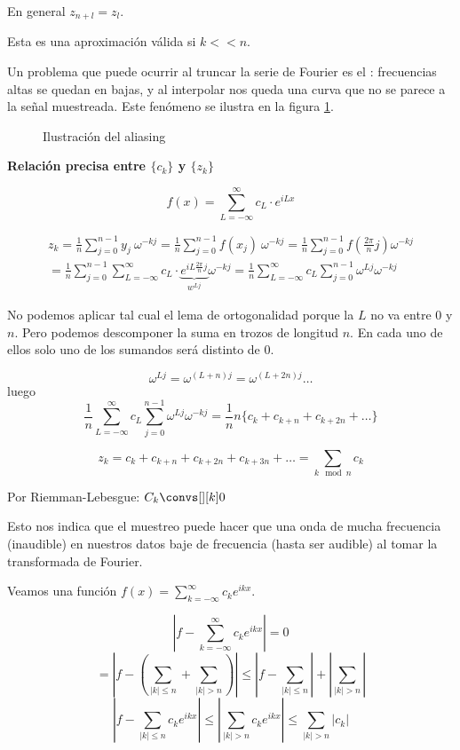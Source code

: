 			En general $z_{n+l} = z_{l}$.

			Esta es una aproximación válida si  $k << n$.

			Un problema que puede ocurrir al truncar la serie de Fourier es el : frecuencias altas se quedan en bajas, y al interpolar nos queda una curva que no se parece a la señal muestreada. Este fenómeno se ilustra en la figura \ref{fig:Aliasing}.
			\begin{figure}[hbtp]
				\caption{Ilustración del aliasing}
				\label{fig:Aliasing}
			\end{figure}


			\textbf{Relación precisa entre $\{c_k\}$ y $\{z_k\}$}

			\[ f(x) = \sum_{L=-\infty}^\infty c_L \cdot e^{iLx}  \]

			\begin{gather*}
			z_k = \frac{1}{n}  \sum_{j=0}^{n-1} y_j\ \omega^{-kj} = \frac{1}{n} \sum_{j=0}^{n-1}  f(x_j)\ \omega^{-kj} = \frac{1}{n} \sum_{j=0}^{n-1} f\left( \frac{2\pi}{n} j \right) \omega^{-kj}  \\
			= \frac{1}{n} \sum_{j=0}^{n-1} \sum_{L=-\infty}^{\infty} c_L \cdot \underbrace{e^{iL\frac{2\pi}{n}j}}_{w^{Lj}} \omega^{-kj} = \frac{1}{n} \sum_{L=-\infty}^{\infty} c_L \sum_{j=0}^{n-1} \omega^{Lj} \omega^{-kj}
			\end{gather*}

			No podemos aplicar tal cual el lema de ortogonalidad porque la $L$ no va entre 0 y $n$. Pero podemos descomponer la suma en trozos de longitud $n$. En cada uno de ellos solo uno de los sumandos será distinto de 0.

			\[ \omega^{Lj} = \omega^{(L+n)j} = \omega^{(L+2n)j} … \]
			luego
			\[ \frac{1}{n} \sum_{L=-\infty}^{\infty} c_L \sum_{j=0}^{n-1} \omega^{Lj} \omega^{-kj} = \frac{1}{n} n \{ c_k + c_{k+n} + c_{k+2n} + … \}  \]

			\[ z_k = c_k + c_{k+n} + c_{k+2n} + c_{k+3n} + … = \sum_{k \mod n} c_k  \]

			Por Riemman-Lebesgue: $C_k \convs[][k] 0$

			Esto nos indica que el muestreo puede hacer que una onda de mucha frecuencia (inaudible) en nuestros datos baje de frecuencia (hasta ser audible) al tomar la transformada de Fourier.


			\obs Veamos una función $f(x) = \sum\limits_{k=-\infty}^{\infty} c_k e^{ikx}$.

			\[ \left|  f - \sum_{k=-\infty}^{\infty} c_k e^{ikx} \right| = 0 \]
			\[ = \left|  f - \left( \sum_{|k|\leq n} + \sum_{|k| > n} \right) \right| \leq \left|  f- \sum_{|k| \leq n} \right| + \left| \sum_{|k| > n} \right| \]
			\[ \left| f- \sum_{|k| \leq n} c_k e^{ikx} \right| \leq \left| \sum_{|k| > n} c_k e^{ikx} \right| \leq \sum_{|k| > n} |c_k|  \]

